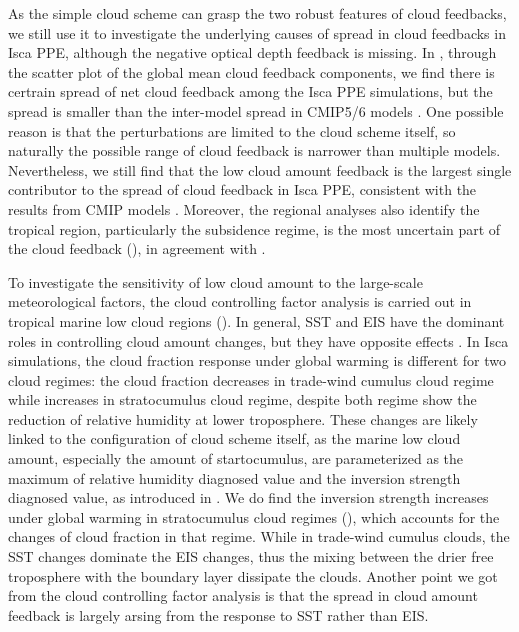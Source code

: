 As the simple cloud scheme can grasp the two robust features of cloud feedbacks, we still use it to investigate the underlying causes of spread in cloud feedbacks in Isca PPE, although the negative optical depth feedback is missing. In , through the scatter plot of the global mean cloud feedback components, we find there is certrain spread of net cloud feedback among the Isca PPE simulations, but the spread is smaller than the inter-model spread in CMIP5/6 models \citep{Ceppi2017,Zelinka2020causes}. One possible reason is that the perturbations are limited to the cloud scheme itself, so naturally the possible range of cloud feedback is narrower than multiple models. Nevertheless, we still find that the low cloud amount feedback is the largest single contributor to the spread of cloud feedback in Isca PPE, consistent with the results from CMIP models \citep{Zelinka2016insights}. Moreover, the regional analyses also identify the tropical region, particularly the subsidence regime, is the most uncertain part of the cloud feedback (), in agreement with \cite{Bony2005}. 

To investigate the sensitivity of low cloud amount to the large-scale meteorological factors, the cloud controlling factor analysis is carried out in tropical marine low cloud regions (). In general, SST and EIS have the dominant roles in controlling cloud amount changes, but they have opposite effects \citep[e.g.,][]{Qu2014,Qu2015positive,Klein2017low,Scott2020,Cesana2021}. In Isca simulations, the cloud fraction response under global warming is different for two cloud regimes: the cloud fraction decreases in trade-wind cumulus cloud regime while increases in stratocumulus cloud regime, despite both regime show the reduction of relative humidity at lower troposphere. These changes are likely linked to the configuration of cloud scheme itself, as the marine low cloud amount, especially the amount of startocumulus, are parameterized as the maximum of relative humidity diagnosed value and the inversion strength diagnosed value, as introduced in . We do find the inversion strength increases under global warming in stratocumulus cloud regimes (), which accounts for the changes of cloud fraction in that regime. While in trade-wind cumulus clouds, the SST changes dominate the EIS changes, thus the mixing between the drier free troposphere with the boundary layer dissipate the clouds. Another point we got from the cloud controlling factor analysis is that the spread in cloud amount feedback is largely arsing from the response to SST rather than EIS.

